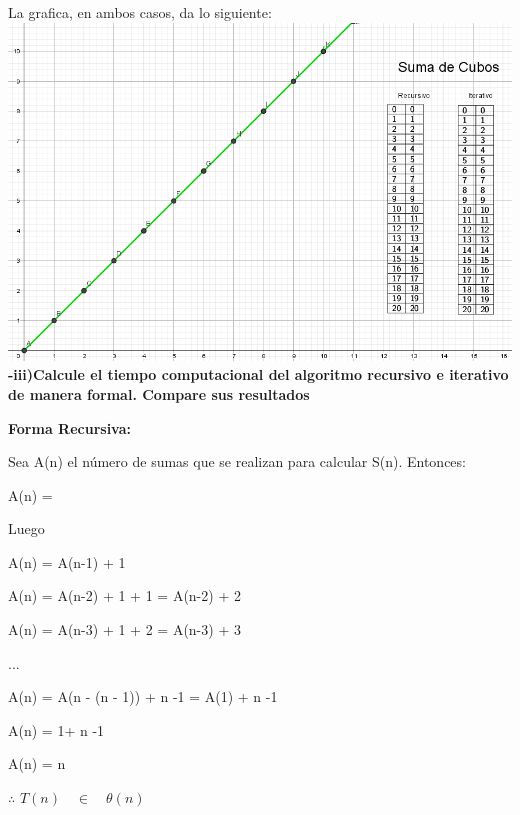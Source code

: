\documentclass[spanish]{article}
\begin{document}
\newpage
La grafica, en ambos casos, da lo siguiente:\\
\includegraphics{./imagenes/graficaCubos.PNG}\\
\newpage
{\large{\bf-iii)Calcule el tiempo computacional del algoritmo recursivo e iterativo de manera formal. Compare sus resultados}}\\

	\bigskip
	
	{\bf{Forma Recursiva:}}
	
	\bigskip

	Sea A(n) el número de sumas que se realizan para calcular 	S(n). Entonces:

	\bigskip
	
	A(n) = 

	\bigskip

	Luego

	\bigskip

	A(n) = A(n-1) + 1

	\bigskip

	A(n) = A(n-2) + 1 + 1 = A(n-2) + 2

	\bigskip

	A(n) = A(n-3) + 1 + 2 = A(n-3) + 3

	\bigskip

	...
	
	\bigskip

	A(n) = A(n - (n - 1)) + n -1 = A(1) + n -1



	A(n) = 1+ n -1

	\bigskip

	A(n) = n

	\bigskip

	$\therefore$
	$ T(n) \quad\in\quad \theta(n)$	
\end{document}
